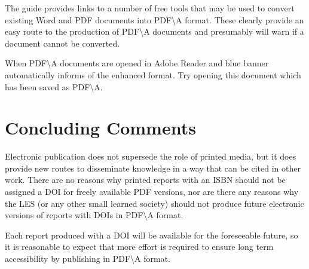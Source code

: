 \documentclass{article}
\begin{document}
 The guide provides links to a number of free tools that may be used to convert existing Word and PDF documents into PDF\textbackslash A format. These clearly provide an easy route to the production of PDF\textbackslash A documents and presumably will warn if a document cannot be converted. 
 
 When PDF\textbackslash A documents are opened in Adobe Reader and blue banner automatically informs of the enhanced format. Try opening this document which has been saved as PDF\textbackslash A.
 
 \section{Concluding Comments}
 
Electronic publication does not supersede the role of printed media, but it does provide new routes to disseminate knowledge in a way that can be cited in other work. There are no reasons why printed reports with an ISBN should not be assigned a DOI for freely available PDF versions, nor are there any reasons why the LES (or any other small learned society) should not produce future electronic versions of reports with DOIs in PDF\textbackslash A format.

Each report produced with a DOI will be available for the foreseeable future, so it is reasonable to expect that more effort is required to ensure long term accessibility by publishing in PDF\textbackslash A format.





\end{document}
